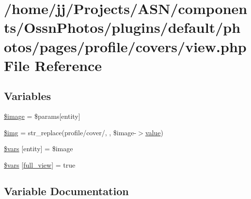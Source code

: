 \hypertarget{components_2_ossn_photos_2plugins_2default_2photos_2pages_2profile_2covers_2view_8php}{}\section{/home/jj/\+Projects/\+A\+S\+N/components/\+Ossn\+Photos/plugins/default/photos/pages/profile/covers/view.php File Reference}
\label{components_2_ossn_photos_2plugins_2default_2photos_2pages_2profile_2covers_2view_8php}
\subsection*{Variables}
\begin{DoxyCompactItemize}
\item 
\hyperlink{components_2_ossn_photos_2plugins_2default_2photos_2pages_2profile_2covers_2view_8php_aac6146b4cdec66c94263ddb55afd5946}{\$image} = \$params\mbox{[}\textquotesingle{}entity\textquotesingle{}\mbox{]}
\item 
\hyperlink{components_2_ossn_photos_2plugins_2default_2photos_2pages_2profile_2covers_2view_8php_a56a9a0da0c26b3d3029cea47a6b9292f}{\$img} = str\+\_\+replace(\textquotesingle{}profile/cover/\textquotesingle{}, \textquotesingle{}\textquotesingle{}, \$image-\/$>$\hyperlink{fullpage_2plugin_8min_8js_ac56c57897e10f699d124e0103921aa20}{value})
\item 
\hyperlink{components_2_ossn_photos_2plugins_2default_2photos_2pages_2profile_2covers_2view_8php_aa07d093940e8b3330058e9f2c4396426}{\$vars} \mbox{[}\textquotesingle{}entity\textquotesingle{}\mbox{]} = \$image
\item 
\hyperlink{components_2_ossn_photos_2plugins_2default_2photos_2pages_2profile_2covers_2view_8php_a06867e093d38c49799871f55ab9ff793}{\$vars} \mbox{[}\textquotesingle{}\hyperlink{components_2_ossn_wall_2plugins_2default_2wall_2pages_2view_8php_a8aa2e512060821710745c7a77b98b65f}{full\+\_\+view}\textquotesingle{}\mbox{]} = true
\end{DoxyCompactItemize}


\subsection{Variable Documentation}
